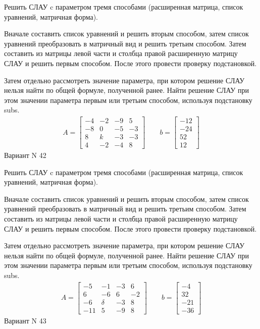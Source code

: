 \documentclass[11pt]{report}
\begin{document}
Решить СЛАУ c параметром тремя способами (расширенная матрица, список уравнений, матричная форма).

Вначале составить список уравнений и решить вторым способом,
затем список уравнений преобразовать в матричный вид и решить третьим способом.
Затем составить из матрицы левой части и столбца правой расширенную матрицу СЛАУ и решить первым способом.
После этого провести проверку подстановкой.

Затем отдельно рассмотреть значение параметра, при котором решение СЛАУ нельзя найти по общей формуле,
полученной ранее.
Найти решение СЛАУ при этом значении параметра первым или третьим способом, используя подстановку subs.
\begin{align*}
    A = \left[\begin{matrix}-4 & -2 & -9 & 5\\-8 & 0 & -5 & -3\\8 & k & -3 & -3\\4 & -2 & -4 & 8\end{matrix}\right]
\qquad b = \left[\begin{matrix}-12\\-24\\52\\12\end{matrix}\right]
\end{align*}
\newpage
Вариант N 42


Решить СЛАУ c параметром тремя способами (расширенная матрица, список уравнений, матричная форма).

Вначале составить список уравнений и решить вторым способом,
затем список уравнений преобразовать в матричный вид и решить третьим способом.
Затем составить из матрицы левой части и столбца правой расширенную матрицу СЛАУ и решить первым способом.
После этого провести проверку подстановкой.

Затем отдельно рассмотреть значение параметра, при котором решение СЛАУ нельзя найти по общей формуле,
полученной ранее.
Найти решение СЛАУ при этом значении параметра первым или третьим способом, используя подстановку subs.
\begin{align*}
    A = \left[\begin{matrix}-5 & -1 & -3 & 6\\6 & -6 & 6 & -2\\-6 & \delta & -3 & 8\\-11 & 5 & -9 & 8\end{matrix}\right]
\qquad b = \left[\begin{matrix}-4\\32\\-21\\-36\end{matrix}\right]
\end{align*}
\newpage
Вариант N 43
\end{document}
